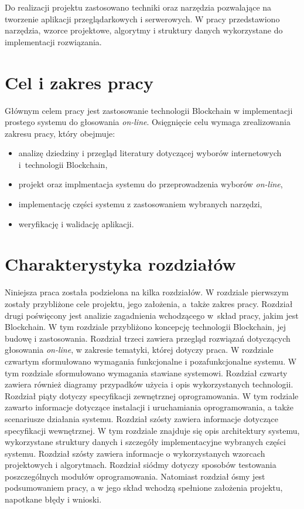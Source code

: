 \documentclass[a4paper,12pt]{book}
\begin{document}
Do realizacji projektu zastosowano techniki oraz narzędzia pozwalające na tworzenie aplikacji przeglądarkowych i serwerowych. W pracy przedstawiono narzędzia, wzorce projektowe, algorytmy i struktury danych wykorzystane do implementacji rozwiązania.

\section{Cel i zakres pracy}
Głównym celem pracy jest zastosowanie technologii Blockchain w implementacji prostego systemu do głosowania \textit{on-line}. Osięgnięcie celu wymaga zrealizowania zakresu pracy, który obejmuje:

\begin{itemize}
	\item analizę dziedziny i przegląd literatury dotyczącej wyborów internetowych i~technologii Blockchain,
	\item projekt oraz implmentacja systemu do przeprowadzenia wyborów \textit{on-line},
	\item implementację części systemu z zastosowaniem wybranych narzędzi,
	\item weryfikację i walidację aplikacji.
\end{itemize}

\section{Charakterystyka rozdziałów}

Niniejsza praca została podzielona na kilka rozdziałów. W rozdziale pierwszym zostały przybliżone cele projektu, jego założenia, a~także zakres pracy. Rozdział drugi poświęcony jest analizie zagadnienia wchodzącego w~skład pracy, jakim jest Blockchain. W tym rozdziale przybliżono koncepcję technologii Blockchain, jej budowę i zastosowania. Rozdział trzeci zawiera przegląd rozwiązań dotyczących głosowania \textit{on-line}, w zakresie tematyki, której dotyczy praca. W rozdziale czwartym sformułowano wymagania funkcjonalne i pozafunkcjonalne systemu. W tym rozdziale sformułowano wymagania stawiane systemowi. Rozdział czwarty zawiera również diagramy przypadków użycia i opis wykorzystanych technologii. Rozdział piąty dotyczy specyfikacji zewnętrznej oprogramowania. W tym rodziale zawarto informacje dotyczące instalacji i uruchamiania oprogramowania, a także scenariusze działania systemu. Rozdział szósty zawiera informacje dotyczące specyfikacji wewnętrznej. W tym rozdziale znajduje się opis architektury systemu, wykorzystane struktury danych i szczegóły implementacyjne wybranych części systemu. Rozdział szósty zawiera informacje o wykorzystanych wzorcach projektowych i algorytmach. Rozdział siódmy dotyczy sposobów testowania poszczególnych modułów oprogramowania. Natomiast rozdział ósmy jest podsumowaniem pracy, a w jego skład wchodzą spełnione założenia projektu, napotkane błędy i wnioski.
\end{document}
